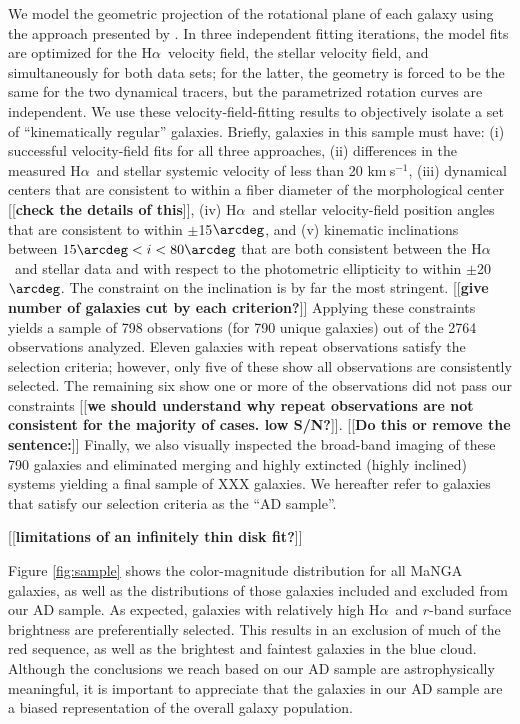 \documentclass[apj,iop,revtex4,numberedappendix]{emulateapj}
\newcommand{\comment}[2][todo]{{\color{#1}[[{\bf #2}]]}}
\newcommand{\kms}{{km$~\!$s$^{-1}$}}
\newcommand{\halpha}{H$\alpha$}
\begin{document}
We model the geometric projection of the rotational plane of each galaxy
using the approach presented by \citep[][see also
\citealt{2011ApJ...742...18W}]{2003ApJ...599L..79A}.  In three
independent fitting iterations, the model fits are optimized for the
\halpha\ velocity field, the stellar velocity field, and simultaneously
for both data sets; for the latter, the geometry is forced to be the
same for the two dynamical tracers, but the parametrized rotation curves
are independent.  We use these velocity-field-fitting results to
objectively isolate a set of ``kinematically regular'' galaxies.
Briefly, galaxies in this sample must have: (i) successful
velocity-field fits for all three approaches, (ii) differences in the
measured \halpha\ and stellar systemic velocity of less than 20 \kms,
(iii) dynamical centers that are consistent to within a fiber diameter
of the morphological center \comment{check the details of this}, (iv)
\halpha\ and stellar velocity-field position angles that are consistent
to within $\pm$15$\arcdeg$, and (v) kinematic inclinations between
$15\arcdeg < i < 80\arcdeg$ that are both consistent between the
\halpha\ and stellar data and with respect to the photometric
ellipticity to within $\pm$20$\arcdeg$.  The constraint on the
inclination is by far the most stringent. \comment{give number of
galaxies cut by each criterion?}  Applying these constraints yields a
sample of 798 observations (for 790 unique galaxies) out of the 2764
observations analyzed.  Eleven galaxies with repeat observations satisfy
the selection criteria; however, only five of these show all
observations are consistently selected.  The remaining six show one or
more of the observations did not pass our constraints \comment{we should
understand why repeat observations are not consistent for the majority
of cases.  low S/N?}.  \comment{Do this or remove the sentence:}
Finally, we also visually inspected the broad-band imaging of these 790
galaxies and eliminated merging and highly extincted (highly inclined)
systems yielding a final sample of XXX galaxies.  We hereafter refer to
galaxies that satisfy our selection criteria as the ``AD sample''.

\comment{limitations of an infinitely thin disk fit?}

Figure \ref{fig:sample} shows the color-magnitude distribution for all
MaNGA galaxies, as well as the distributions of those galaxies included
and excluded from our AD sample.  As expected, galaxies with relatively
high \halpha\ and $r$-band surface brightness are preferentially
selected.  This results in an exclusion of much of the red sequence, as
well as the brightest and faintest galaxies in the blue cloud.  Although
the conclusions we reach based on our AD sample are astrophysically
meaningful, it is important to appreciate that the galaxies in our AD
sample are a biased representation of the overall galaxy population.
\end{document}
